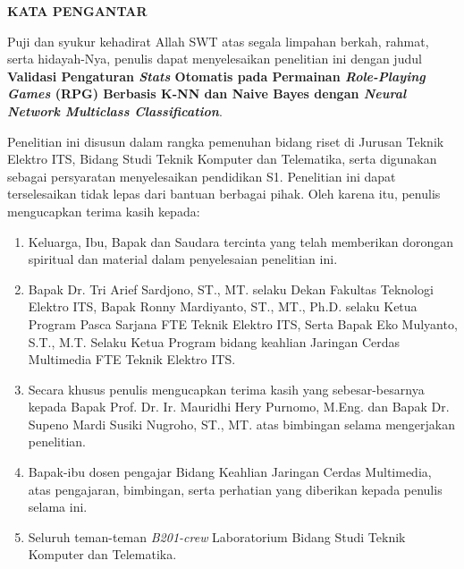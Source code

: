 \begin{center}
\large\textbf{KATA PENGANTAR}
\end{center}
\vspace{2ex}

\setlength{\parindent}{1cm} Puji dan syukur kehadirat Allah SWT atas segala limpahan berkah, rahmat, serta hidayah-Nya, penulis  dapat menyelesaikan penelitian ini dengan judul \textbf{Validasi Pengaturan \textit{Stats} Otomatis pada Permainan \textit{Role-Playing Games} (RPG) Berbasis K-NN dan Naive Bayes dengan \textit{Neural Network Multiclass Classification}}.
\vspace{1ex}

Penelitian ini disusun dalam rangka pemenuhan bidang riset di Jurusan Teknik Elektro ITS, Bidang  Studi Teknik Komputer dan Telematika, serta digunakan sebagai persyaratan menyelesaikan pendidikan  S1. Penelitian ini dapat terselesaikan tidak lepas dari bantuan berbagai pihak. Oleh karena itu, penulis mengucapkan terima kasih kepada:
\vspace{1ex}

\begin{enumerate}[nolistsep]
	\item Keluarga, Ibu, Bapak dan Saudara tercinta yang telah memberikan dorongan spiritual dan material dalam penyelesaian penelitian ini.
	\vspace{1ex}
	\item Bapak Dr. Tri Arief Sardjono, ST., MT. selaku Dekan Fakultas Teknologi Elektro ITS, Bapak Ronny Mardiyanto, ST., MT., Ph.D. selaku Ketua Program Pasca Sarjana FTE Teknik Elektro ITS, Serta Bapak Eko Mulyanto, S.T., M.T. Selaku Ketua Program bidang keahlian Jaringan Cerdas Multimedia FTE Teknik Elektro ITS.
	\vspace{1ex}
	\item Secara khusus penulis mengucapkan terima kasih yang sebesar-besarnya kepada Bapak Prof. Dr. Ir. Mauridhi Hery Purnomo, M.Eng. dan Bapak Dr. Supeno Mardi Susiki Nugroho, ST., MT. atas bimbingan selama mengerjakan  penelitian.
	\vspace{1ex}
	\item Bapak-ibu dosen pengajar Bidang Keahlian Jaringan Cerdas Multimedia, atas pengajaran,  bimbingan, serta perhatian yang diberikan kepada penulis selama ini.
	\vspace{1ex}
	\item Seluruh teman-teman \textit{B201-crew} Laboratorium Bidang Studi Teknik Komputer dan Telematika.
\end{enumerate}
\vspace{1ex}

